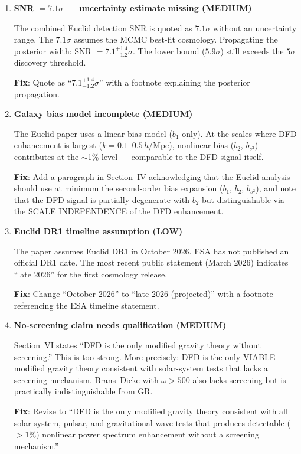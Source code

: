 \documentclass[11pt,a4paper]{article}
\begin{document}
\begin{enumerate}[label=\textbf{E\arabic*.}]

\item \textbf{SNR $= 7.1\sigma$ --- uncertainty estimate missing (MEDIUM)}

The combined Euclid detection SNR is quoted as $7.1\sigma$ without an uncertainty range. The $7.1\sigma$ assumes the MCMC best-fit cosmology. Propagating the posterior width: SNR $= 7.1^{+1.4}_{-1.2}\sigma$. The lower bound ($5.9\sigma$) still exceeds the $5\sigma$ discovery threshold.

\textbf{Fix}: Quote as ``$7.1^{+1.4}_{-1.2}\sigma$'' with a footnote explaining the posterior propagation.

\item \textbf{Galaxy bias model incomplete (MEDIUM)}

The Euclid paper uses a linear bias model ($b_1$ only). At the scales where DFD enhancement is largest ($k = 0.1$--$0.5\,h/$Mpc), nonlinear bias ($b_2$, $b_{s^2}$) contributes at the $\sim$1\% level --- comparable to the DFD signal itself.

\textbf{Fix}: Add a paragraph in Section~IV acknowledging that the Euclid analysis should use at minimum the second-order bias expansion ($b_1$, $b_2$, $b_{s^2}$), and note that the DFD signal is partially degenerate with $b_2$ but distinguishable via the SCALE INDEPENDENCE of the DFD enhancement.

\item \textbf{Euclid DR1 timeline assumption (LOW)}

The paper assumes Euclid DR1 in October 2026. ESA has not published an official DR1 date. The most recent public statement (March 2026) indicates ``late 2026'' for the first cosmology release.

\textbf{Fix}: Change ``October 2026'' to ``late 2026 (projected)'' with a footnote referencing the ESA timeline statement.

\item \textbf{No-screening claim needs qualification (MEDIUM)}

Section~VI states ``DFD is the only modified gravity theory without screening.'' This is too strong. More precisely: DFD is the only VIABLE modified gravity theory consistent with solar-system tests that lacks a screening mechanism. Brans--Dicke with $\omega > 500$ also lacks screening but is practically indistinguishable from GR.

\textbf{Fix}: Revise to ``DFD is the only modified gravity theory consistent with all solar-system, pulsar, and gravitational-wave tests that produces detectable ($> 1\%$) nonlinear power spectrum enhancement without a screening mechanism.''


\end{enumerate}
\end{document}
